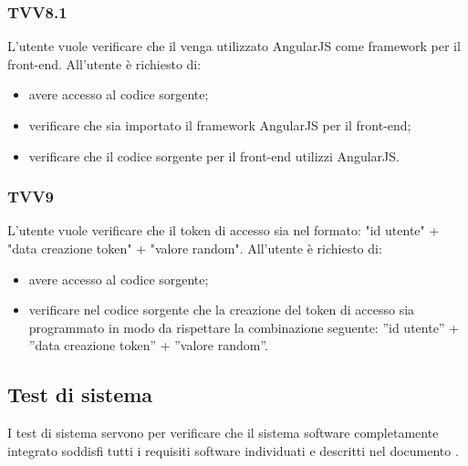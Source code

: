 		\subsubsection{TVV8.1}
			L'utente vuole verificare che il venga utilizzato AngularJS come framework per il front-end. All'utente è richiesto di:
			\begin{itemize}
				\item avere accesso al codice sorgente;
				\item verificare che sia importato il framework AngularJS per il front-end;
				\item verificare che il codice sorgente per il front-end utilizzi AngularJS.
			\end{itemize}
			
		\subsubsection{TVV9}
			L'utente vuole verificare che il token di accesso sia nel formato: "id utente" + "data creazione token" + "valore random". All'utente è richiesto di:
			\begin{itemize}
				\item avere accesso al codice sorgente;
				\item verificare nel codice sorgente che la creazione del token di accesso sia programmato in modo da rispettare la combinazione seguente: ''id utente'' + ''data creazione token'' + ''valore random''.
			\end{itemize}
			
\pagebreak

	\subsection{Test di sistema}
		I test di sistema servono per verificare che il sistema software completamente integrato soddisfi tutti i requisiti software individuati e descritti nel documento \docNameVersionAdR.
